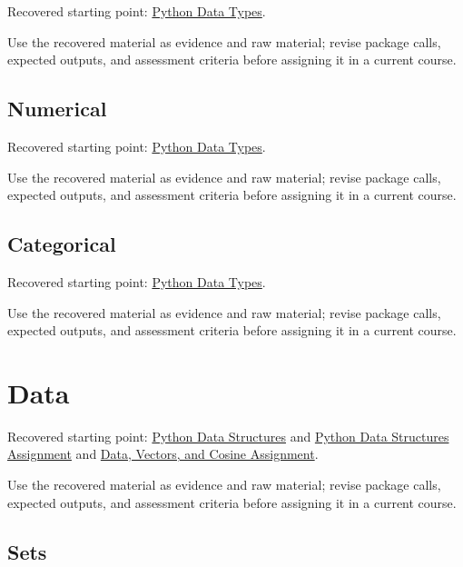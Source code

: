 \documentclass[
  letterpaper,
]{scrbook}
\begin{document}

Recovered starting point: \hyperref[sec-lab-python-data-types]{Python
Data Types}.

Use the recovered material as evidence and raw material; revise package
calls, expected outputs, and assessment criteria before assigning it in
a current course.

\subsection*{Numerical}\label{sec-pr-02-numerical}

Recovered starting point: \hyperref[sec-lab-python-data-types]{Python
Data Types}.

Use the recovered material as evidence and raw material; revise package
calls, expected outputs, and assessment criteria before assigning it in
a current course.

\subsection*{Categorical}\label{sec-pr-02-categorical}

Recovered starting point: \hyperref[sec-lab-python-data-types]{Python
Data Types}.

Use the recovered material as evidence and raw material; revise package
calls, expected outputs, and assessment criteria before assigning it in
a current course.

\section*{Data}\label{sec-pr-02-data}


Recovered starting point:
\hyperref[sec-lab-python-data-structures]{Python Data Structures} and
\hyperref[sec-lab-python-data-structures-assignment]{Python Data
Structures Assignment} and
\hyperref[sec-lab-data-initialization-assignment]{Data, Vectors, and
Cosine Assignment}.

Use the recovered material as evidence and raw material; revise package
calls, expected outputs, and assessment criteria before assigning it in
a current course.

\subsection*{Sets}\label{sec-pr-02-sets}
\end{document}
